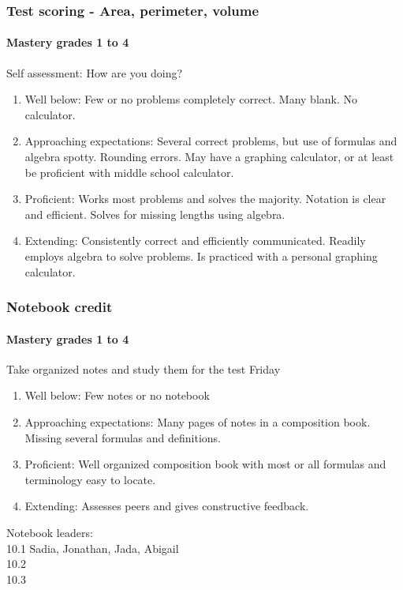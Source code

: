 \documentclass{beamer}
\begin{document}
\frame
{
  \frametitle{Test scoring - Area, perimeter, volume}
  \framesubtitle{Mastery grades 1 to 4}

  \begin{block}{Self assessment: How are you doing?}
    
    \begin{enumerate}
    \item Well below: Few or no problems completely correct. Many blank. No calculator.
    \item Approaching expectations: Several correct problems, but use of formulas and algebra spotty. Rounding errors. May have a graphing calculator, or at least be proficient with middle school calculator.
    \item Proficient: Works most problems and solves the majority. Notation is clear and efficient. Solves for missing lengths using algebra.
    \item Extending: Consistently correct and efficiently communicated. Readily employs algebra to solve problems. Is practiced with a personal graphing calculator.
    \end{enumerate}
  \end{block}
}

\frame
{
  \frametitle{Notebook credit}
  \framesubtitle{Mastery grades 1 to 4}

  \begin{block}{Take organized notes and study them for the test Friday}
      \begin{enumerate}
        \item Well below: Few notes or no notebook
        \item Approaching expectations: Many pages of notes in a composition book. Missing several formulas and definitions.
        \item Proficient: Well organized composition book with most or all formulas and terminology easy to locate.
        \item Extending: Assesses peers and gives constructive feedback.
        \end{enumerate}\vspace{0.3cm}
        Notebook leaders: \\
        10.1 Sadia, Jonathan, Jada, Abigail\\
        10.2 \\
        10.3 

  \end{block}
}
\end{document}
